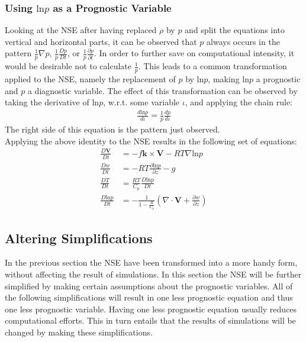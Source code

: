 \subsubsection{Using $\text{ln}p$ as a Prognostic Variable}
Looking at the NSE after having replaced $\rho$ by $p$ and split the equations into vertical and horizontal parts, it can be observed that $p$ always occurs in the pattern $\frac{1}{p}\nabla p$, $\frac{1}{p}\frac{Dp}{Dt}$, or $\frac{1}{p}\frac{\partial p}{\partial t}$.
In order to further save on computational intensity, it would be desirable not to calculate $\frac{1}{p}$.
This leads to a common transformation applied to the NSE, namely the replacement of $p$ by $\text{ln}p$, making $\text{ln}p$ a prognostic and $p$ a diagnostic variable.
The effect of this transformation can be observed by taking the derivative of $\text{ln}p$, w.r.t. some variable $\iota$, and applying the chain rule:
\begin{align*}
\frac{d\text{ln}p}{d\iota} =  \frac{1}{p}\frac{dp}{d\iota}
\end{align*}
The right side of this equation is the pattern just observed.
\\
Applying the above identity to the NSE results in the following set of equations:
\begin{align*}
\frac{D\textbf{V}}{Dt} &= -f\boldsymbol{k} \times \textbf{V} - RT\nabla \text{ln}p\\
\frac{Dw}{Dt} &= - RT \frac{\partial \text{ln}p}{\partial z} - g \\
\frac{DT}{Dt} &= \frac{RT}{C_p}\frac{D\text{ln}p}{Dt}\\
\frac{D\text{ln}p}{Dt} &= -\frac{1}{1- \frac{R}{C_p}} \left(\nabla \cdot \textbf{V} + \frac{\partial w}{\partial z}\right)
\end{align*}

\subsection{Altering Simplifications}
In the previous section the NSE have been transformed into a more handy form, without affecting the result of simulations.
In this section the NSE will be further simplified by making certain assumptions about the prognostic variables.
All of the following simplifications will result in one less prognostic equation and thus one less prognostic variable.
Having one less prognostic equation usually reduces computational efforts.
This in turn entails that the results of simulations will be changed by making these simplifications.

